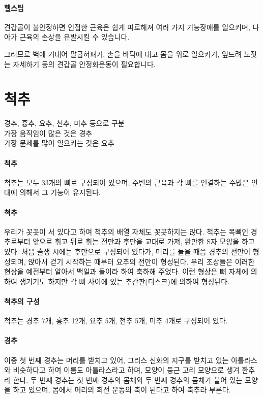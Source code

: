 \documentclass[12pt, a4paper, oneside]{book}
\let\stdsection\section
\renewcommand\section{\newpage\stdsection}
\begin{document}
	\paragraph{헬스팁}
			견갑골이 불안정하면 인접한 근육은 쉽게 피로해져 여러 가지 기능장애를 일으키며, 나아가 근육의 손상을 유발시킬 수 있습니다.
			
			그러므로 벽에 기대어 팔굽혀펴기, 손을 바닥에 대고 몸을 위로 일으키기, 엎드려 노젓는 자세하기 등의 견갑골 안정화운동이 필요합니다.



		\section{척추}

경추, 흉추, 요추, 천추, 미추 등으로 구분 \\
가장 움직임이 많은 것은 경추 \\
가장 문제를 많이 일으키는 것은 요추 \\

\paragraph{척추}
척추는 모두 33개의 뼈로 구성되어 있으며, 주변의 근육과 각 뼈를 연결하는 수많은 인대에 의해서 그 기능이 유지된다. 

\paragraph{척추}
우리가 꼿꼿이 서 있다고 하여 척추의 배열 자체도 꼿꼿하지는 않다. 
척추는 목뼈인 경추로부터 앞으로 휘고 뒤로 휘는 전만과 후만을 교대로 가져, 완만한 S자 모양을 하고 있다. 
처음 출생 시에는 후만으로 구성되어 있다가, 머리를 들을 때쯤 경추의 전만이 형성되며, 앉아서 걷기 시작하는 때부터 요추의 전만이 형성된다. 
우리 조상들은 이러한 현상을 예전부터 알아서 백일과 돌이라 하여 축하해 주었다. 
이런 형상은 뼈 자체에 의하여 생기기도 하지만 각 뼈 사이에 있는 추간판(디스크)에 의하여 형성된다. 

\paragraph{척추의 구성}
척추는 경추 7개, 흉추 12개, 요추 5개, 천추 5개, 미추 4개로 구성되어 있다. 

\paragraph{경추}
이중 첫 번째 경추는 머리를 받치고 있어, 그리스 신화의 지구를 받치고 있는 아틀라스와 비슷하다고 하여 이름도 아틀라스라고 하며, 모양이 둥근 고리 모양으로 생겨 환추라 한다. 두 번째 경추는 첫 번째 경추의 몸체와 두 번째 경추의 몸체가 붙어 있는 모양을 하고 있으며, 몸에서 머리의 회전 운동의 축이 된다고 하여 축추라 부른다. 
\end{document}
